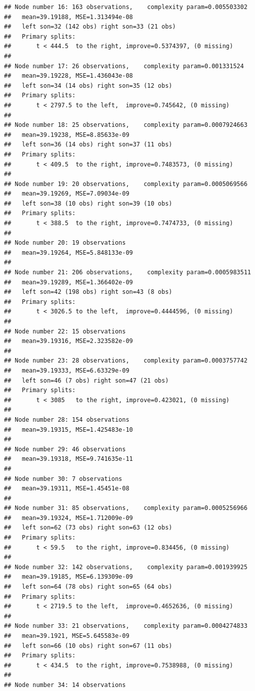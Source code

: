 \documentclass[
]{book}
\begin{document}
\begin{verbatim}
## Node number 16: 163 observations,    complexity param=0.005503302
##   mean=39.19188, MSE=1.313494e-08 
##   left son=32 (142 obs) right son=33 (21 obs)
##   Primary splits:
##       t < 444.5  to the right, improve=0.5374397, (0 missing)
## 
## Node number 17: 26 observations,    complexity param=0.001331524
##   mean=39.19228, MSE=1.436043e-08 
##   left son=34 (14 obs) right son=35 (12 obs)
##   Primary splits:
##       t < 2797.5 to the left,  improve=0.745642, (0 missing)
## 
## Node number 18: 25 observations,    complexity param=0.0007924663
##   mean=39.19238, MSE=8.85633e-09 
##   left son=36 (14 obs) right son=37 (11 obs)
##   Primary splits:
##       t < 409.5  to the right, improve=0.7483573, (0 missing)
## 
## Node number 19: 20 observations,    complexity param=0.0005069566
##   mean=39.19269, MSE=7.09034e-09 
##   left son=38 (10 obs) right son=39 (10 obs)
##   Primary splits:
##       t < 388.5  to the right, improve=0.7474733, (0 missing)
## 
## Node number 20: 19 observations
##   mean=39.19264, MSE=5.848133e-09 
## 
## Node number 21: 206 observations,    complexity param=0.0005983511
##   mean=39.19289, MSE=1.366402e-09 
##   left son=42 (198 obs) right son=43 (8 obs)
##   Primary splits:
##       t < 3026.5 to the left,  improve=0.4444596, (0 missing)
## 
## Node number 22: 15 observations
##   mean=39.19316, MSE=2.323582e-09 
## 
## Node number 23: 28 observations,    complexity param=0.0003757742
##   mean=39.19333, MSE=6.63329e-09 
##   left son=46 (7 obs) right son=47 (21 obs)
##   Primary splits:
##       t < 3085   to the right, improve=0.423021, (0 missing)
## 
## Node number 28: 154 observations
##   mean=39.19315, MSE=1.425483e-10 
## 
## Node number 29: 46 observations
##   mean=39.19318, MSE=9.741635e-11 
## 
## Node number 30: 7 observations
##   mean=39.19311, MSE=1.45451e-08 
## 
## Node number 31: 85 observations,    complexity param=0.0005256966
##   mean=39.19324, MSE=1.712009e-09 
##   left son=62 (73 obs) right son=63 (12 obs)
##   Primary splits:
##       t < 59.5   to the right, improve=0.834456, (0 missing)
## 
## Node number 32: 142 observations,    complexity param=0.001939925
##   mean=39.19185, MSE=6.139309e-09 
##   left son=64 (78 obs) right son=65 (64 obs)
##   Primary splits:
##       t < 2719.5 to the left,  improve=0.4652636, (0 missing)
## 
## Node number 33: 21 observations,    complexity param=0.0004274833
##   mean=39.1921, MSE=5.645583e-09 
##   left son=66 (10 obs) right son=67 (11 obs)
##   Primary splits:
##       t < 434.5  to the right, improve=0.7538988, (0 missing)
## 
## Node number 34: 14 observations

\end{verbatim}
\end{document}
